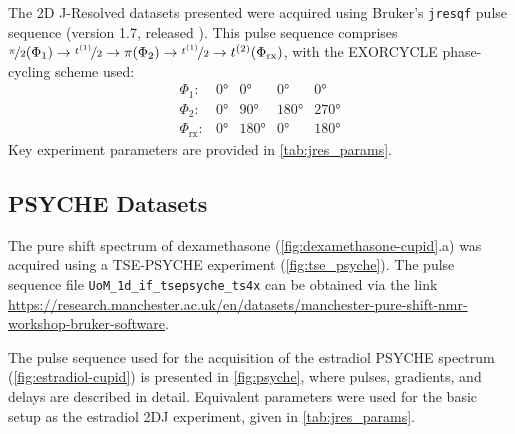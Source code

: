 The 2D J-Resolved datasets presented were acquired using Bruker's
\texttt{jresqf} pulse sequence (version 1.7, released
). This pulse sequence comprises
 $\nicefrac{\pi}{2}(\Phi_1) \rightarrow \nicefrac{t^{(1)}}{2} \rightarrow
\pi(\Phi_{2}) \rightarrow \nicefrac{t^{(1)}}{2} \rightarrow t^{(2)}(\Phi_{\text{rx}})$, with
the EXORCYCLE phase-cycling scheme used\cite[Section 11.6]{Keeler2010}:
\begin{equation*}
    \begin{array}{lllll}
        \Phi_{1}: & \ang{0} & \ang{0} & \ang{0} & \ang{0} \\
        \Phi_{2}: & \ang{0} & \ang{90} & \ang{180} & \ang{270} \\
        \Phi_{\text{rx}}: & \ang{0} & \ang{180} & \ang{0} & \ang{180}
    \end{array}
\end{equation*}
Key experiment parameters are provided in \cref{tab:jres_params}.


\subsection{\acs{PSYCHE} Datasets}
\label{subsec:psyche-datasets}
The pure shift spectrum of dexamethasone (\cref{fig:dexamethasone-cupid}.a) was
acquired using a \ac{TSE-PSYCHE}
experiment (\cref{fig:tse_psyche}). The pulse sequence file
\texttt{UoM\_1d\_if\_tsepsyche\_ts4x} can be obtained via the link
\url{https://research.manchester.ac.uk/en/datasets/manchester-pure-shift-nmr-workshop-bruker-software}.

The pulse sequence used for the acquisition of the estradiol \ac{PSYCHE}
spectrum (\cref{fig:estradiol-cupid}) is presented in
\cref{fig:psyche}, where
pulses, gradients, and delays are described in detail. Equivalent parameters
were used for the basic setup as the estradiol 2DJ experiment, given in
\cref{tab:jres_params}.

